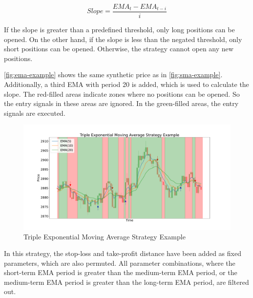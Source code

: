 \[
    Slope = \frac{EMA_t - EMA_{t-i}}{i}
\]

\noindent
If the slope is greater than a predefined threshold, only long positions can be opened.
On the other hand, if the slope is less than the negated threshold, only short positions can be opened.
Otherwise, the strategy cannot open any new positions.

\autoref{fig:ema-example} shows the same synthetic price as in \autoref{fig:sma-example}.
Additionally, a third EMA with period 20 is added, which is used to calculate the slope.
The red-filled areas indicate zones where no positions can be opened.
So the entry signals in these areas are ignored.
In the green-filled areas, the entry signals are executed.

\begin{figure}[H]
    \centering
    \includegraphics[width=\textwidth]{images/trading-strategies/ema-example}
    \caption{Triple Exponential Moving Average Strategy Example}
    \label{fig:ema-example}
\end{figure}

\noindent
In this strategy, the stop-loss and take-profit distance have been added as fixed parameters, which are also permuted.
All parameter combinations, where the short-term EMA period is greater than the medium-term EMA period, or the medium-term EMA period is greater than the long-term EMA period, are filtered out.

